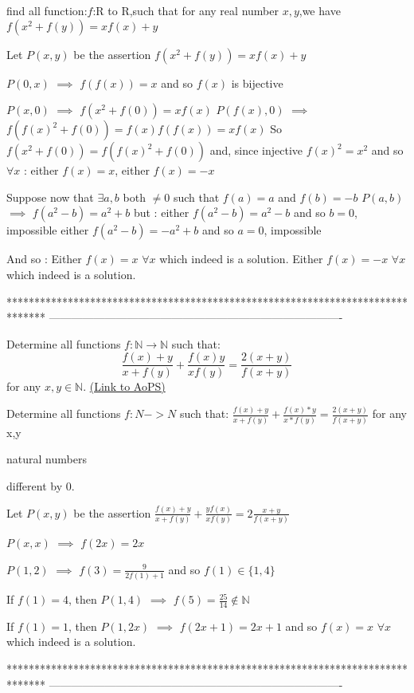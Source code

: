 \begin{solution}
	\begin{tcolorbox}find all function:$f$:R to R,such that for any real number $x,y$,we have
$f(x^{2}+f(y))=xf(x)+y$\end{tcolorbox}
Let $P(x,y)$ be the assertion $f(x^2+f(y))=xf(x)+y$

$P(0,x)$ $\implies$ $f(f(x))=x$ and so $f(x)$ is bijective

$P(x,0)$ $\implies$ $f(x^2+f(0))=xf(x)$
$P(f(x),0)$ $\implies$ $f(f(x)^2+f(0))=f(x)f(f(x))=xf(x)$ 
So $f(x^2+f(0))=f(f(x)^2+f(0))$ and, since injective $f(x)^2=x^2$ and so $\forall x$ : either $f(x)=x$, either $f(x)=-x$

Suppose now that $\exists a,b$ both $\ne 0$ such that $f(a)=a$ and $f(b)=-b$
$P(a,b)$ $\implies$ $f(a^2-b)=a^2+b$ but :
either $f(a^2-b)=a^2-b$ and so $b=0$, impossible
either $f(a^2-b)=-a^2+b$ and so $a=0$, impossible

And so :
Either $f(x)=x$ $\forall x$ which indeed is a solution.
Either $f(x)=-x$ $\forall x$ which indeed is a solution.
\end{solution}
*******************************************************************************
-------------------------------------------------------------------------------

\begin{problem}
	Determine all functions $f: \mathbb N \to \mathbb N$ such that:
\[\frac{f(x)+y}{x+f(y)} + \frac{f(x)y}{xf(y)} = \frac{2(x+y)}{f(x+y)} \]
for any $x, y \in \mathbb N$.
	\flushright \href{https://artofproblemsolving.com/community/c6h454392}{(Link to AoPS)}
\end{problem}



\begin{solution}
	\begin{tcolorbox}Determine all functions $f:N->N $ such that:
$ \frac{f(x)+y}{x+f(y)} + \frac{f(x)*y}{x*f(y)} = \frac{2(x+y)}{f(x+y)} $ for any x,y \begin{bolded}natural numbers\end{bolded} different by 0.\end{tcolorbox}
Let $P(x,y)$ be the assertion $\frac{f(x)+y}{x+f(y)}+\frac{yf(x)}{xf(y)}=2\frac{x+y}{f(x+y)}$

$P(x,x)$ $\implies$ $f(2x)=2x$

$P(1,2)$ $\implies$ $f(3)=\frac{9}{2f(1)+1}$ and so $f(1)\in\{1,4\}$

If $f(1)=4$, then $P(1,4)$ $\implies$ $f(5)=\frac{25}{14}\notin\mathbb N$

If $f(1)=1$, then $P(1,2x)$ $\implies$ $f(2x+1)=2x+1$ and so $\boxed{f(x)=x}$ $\forall x$ which indeed is a solution.
\end{solution}
*******************************************************************************
-------------------------------------------------------------------------------

